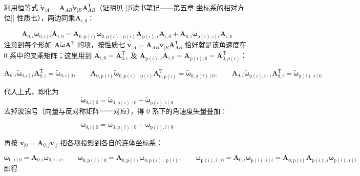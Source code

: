 利用恒等式 $\tilde{\boldsymbol{v}}_{|A}=\boldsymbol{A}_{AB}\tilde{\boldsymbol{v}}_{|B} \boldsymbol{A}_{AB}^\mathrm{T}$（证明见 [[5读书笔记——第五章 坐标系的相对方位]] 性质七），两边同乘$\boldsymbol{A}_{i,0}$：

\[
\boldsymbol{A}_{0,i}\tilde{\boldsymbol{\omega}}_{0,i\mid i}\boldsymbol{A}_{i,0}=
\boldsymbol{A}_{0,\mathrm{p}(i)}\tilde{\boldsymbol{\omega}}_{0,\mathrm{p}(i)\mid \mathrm{p}(i)}\boldsymbol{A}_{\mathrm{p}(i),i}\boldsymbol{A}_{i,0}+
\boldsymbol{A}_{0,i}\tilde{\boldsymbol{\omega}}_{\mathrm{p}(i),i\mid i}\boldsymbol{A}_{i,0}
\]
注意到每个形如 $\boldsymbol{A}\tilde{\boldsymbol{\omega}}\boldsymbol{A}^{\mathrm{T}}$ 的项，按性质七 $\tilde{\boldsymbol{v}}_{|A}=\boldsymbol{A}_{AB}\tilde{\boldsymbol{v}}_{|B}\boldsymbol{A}_{AB}^{\mathrm{T}}$ 恰好就是该角速度在 0 系中的叉乘矩阵；这里用到 $\boldsymbol{A}_{i,0}=\boldsymbol{A}_{0,i}^{\mathrm{T}}$ 及 $\boldsymbol{A}_{\mathrm{p}(i),i}\boldsymbol{A}_{i,0}=\boldsymbol{A}_{\mathrm{p}(i),0}=\boldsymbol{A}_{0,\mathrm{p}(i)}^{\mathrm{T}}$：

\[
\boldsymbol{A}_{0,i}\tilde{\boldsymbol{\omega}}_{0,i\mid i}\boldsymbol{A}_{0,i}^{\mathrm{T}}=\tilde{\boldsymbol{\omega}}_{0,i\mid 0},\qquad
\boldsymbol{A}_{0,\mathrm{p}(i)}\tilde{\boldsymbol{\omega}}_{0,\mathrm{p}(i)\mid \mathrm{p}(i)}\boldsymbol{A}_{0,\mathrm{p}(i)}^{\mathrm{T}}=\tilde{\boldsymbol{\omega}}_{0,\mathrm{p}(i)\mid 0},\qquad
\boldsymbol{A}_{0,i}\tilde{\boldsymbol{\omega}}_{\mathrm{p}(i),i\mid i}\boldsymbol{A}_{0,i}^{\mathrm{T}}=\tilde{\boldsymbol{\omega}}_{\mathrm{p}(i),i\mid 0}
\]

代入上式，即化为
\[
\tilde{\boldsymbol{\omega}}_{0,i\mid 0}=
\tilde{\boldsymbol{\omega}}_{0,\mathrm{p}(i)\mid 0}+
\tilde{\boldsymbol{\omega}}_{\mathrm{p}(i),i\mid 0}
\]
去掉波浪号（向量与反对称矩阵一一对应），得 0 系下的角速度矢量叠加：

\[
\boldsymbol{\omega}_{0,i\mid 0}=\boldsymbol{\omega}_{0,\mathrm{p}(i)\mid 0}+\boldsymbol{\omega}_{\mathrm{p}(i),i\mid 0}
\]

再按 $\boldsymbol{v}_{|0}=\boldsymbol{A}_{0,j}\boldsymbol{v}_{|j}$ 把各项投影到各自的连体坐标系：

\[
\boldsymbol{\omega}_{0,i\mid 0}=\boldsymbol{A}_{0,i}\boldsymbol{\omega}_{0,i\mid i},\qquad
\boldsymbol{\omega}_{0,\mathrm{p}(i)\mid 0}=\boldsymbol{A}_{0,\mathrm{p}(i)}\boldsymbol{\omega}_{0,\mathrm{p}(i)\mid \mathrm{p}(i)},\qquad
\boldsymbol{\omega}_{\mathrm{p}(i),i\mid 0}=\boldsymbol{A}_{0,i}\boldsymbol{\omega}_{\mathrm{p}(i),i\mid i}=\boldsymbol{A}_{0,\mathrm{p}(i)}\boldsymbol{A}_{\mathrm{p}(i),i}\boldsymbol{\omega}_{\mathrm{p}(i),i\mid i}
\]
即得

